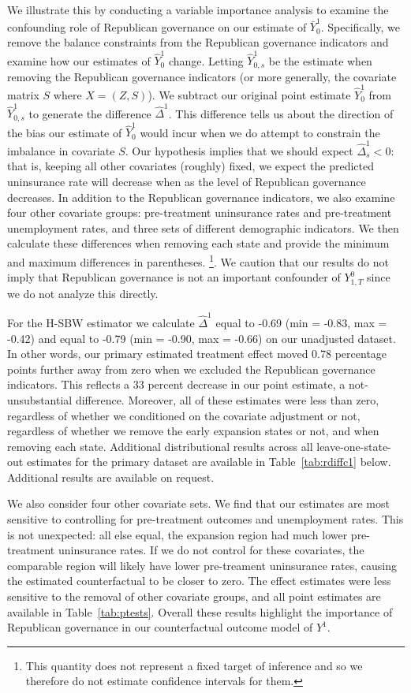 We illustrate this by conducting a variable importance analysis to examine the confounding role of Republican governance on our estimate of $\bar{Y}_0^1$. Specifically, we remove the balance constraints from the Republican governance indicators and examine how our estimates of $\hat{Y}_0^1$ change. Letting $\hat{Y}^1_{0, s}$ be the estimate when removing the Republican governance indicators (or more generally, the covariate matrix $S$ where $X = (Z, S)$). We subtract our original point estimate $\hat{Y}^1_0$ from $\hat{Y}^1_{0, s}$ to generate the difference $\hat{\Delta}^1$. This difference tells us about the direction of the bias our estimate of $\hat{Y}^1_0$ would incur when we do attempt to constrain the imbalance in covariate $S$. Our hypothesis implies that we should expect $\hat{\Delta}_s^1 < 0$: that is, keeping all other covariates (roughly) fixed, we expect the predicted uninsurance rate will decrease when as the level of Republican governance decreases. In addition to the Republican governance indicators, we also examine four other covariate groups: pre-treatment uninsurance rates and pre-treatment unemployment rates, and three sets of different demographic indicators. We then calculate these differences when removing each state and provide the minimum and maximum differences in parentheses. \footnote{This quantity does not represent a fixed target of inference and so we therefore do not estimate confidence intervals for them.}. We caution that our results do not imply that Republican governance is not an important confounder of $Y^0_{1, T}$ since we do not analyze this directly.

For the H-SBW estimator we calculate $\hat{\Delta}^1$ equal to -0.69 (min = -0.83, max = -0.42) and equal to -0.79 (min = -0.90, max = -0.66) on our unadjusted dataset. In other words, our primary estimated treatment effect moved 0.78 percentage points further away from zero when we excluded the Republican governance indicators. This reflects a 33 percent decrease in our point estimate, a not-unsubstantial difference. Moreover, all of these estimates were less than zero, regardless of whether we conditioned on the covariate adjustment or not, regardless of whether we remove the early expansion states or not, and when removing each state. Additional distributional results across all leave-one-state-out estimates for the primary dataset are available in Table~\ref{tab:rdiffc1} below. Additional results are available on request.

We also consider four other covariate sets. We find that our estimates are most sensitive to controlling for pre-treatment outcomes and unemployment rates. This is not unexpected: all else equal, the expansion region had much lower pre-treatment uninsurance rates. If we do not control for these covariates, the comparable region will likely have lower pre-treament uninsurance rates, causing the estimated counterfactual to be closer to zero. The effect estimates were less sensitive to the removal of other covariate groups, and all point estimates are available in Table~\ref{tab:ptests}. Overall these results highlight the importance of Republican governance in our counterfactual outcome model of $Y^1$. 

